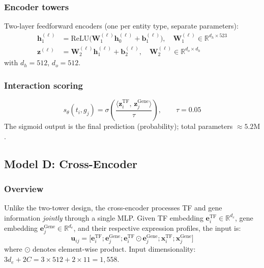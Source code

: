 \documentclass[10pt,twocolumn]{article}
\begin{document}
\subsubsection{Encoder towers}
Two-layer feedforward encoders (one per entity type, separate parameters):
\begin{align}
    \mathbf{h}_1^{(\ell)} &= \text{ReLU}\!\bigl(\mathbf{W}_1^{(\ell)}\mathbf{h}_0^{(\ell)} + \mathbf{b}_1^{(\ell)}\bigr), \quad
    \mathbf{W}_1^{(\ell)} \in \mathbb{R}^{d_h \times 523} \\
    \mathbf{z}^{(\ell)} &= \mathbf{W}_2^{(\ell)}\mathbf{h}_1^{(\ell)} + \mathbf{b}_2^{(\ell)}, \quad
    \mathbf{W}_2^{(\ell)} \in \mathbb{R}^{d_o \times d_h}
\end{align}
with $d_h = 512$, $d_o = 512$.

\subsubsection{Interaction scoring}
\begin{equation}
    s_\theta(t_i, g_j) = \sigma\!\left(\frac{\langle \mathbf{z}^{\text{TF}}_i,\,\mathbf{z}^{\text{Gene}}_j \rangle}{\tau}\right),
    \qquad \tau = 0.05
\end{equation}
The sigmoid output is the final prediction (probability); total parameters $\approx 5.2\mathrm{M}$.

\subsection{Model D: Cross-Encoder}
\label{sec:cross_encoder}

\subsubsection{Overview}
Unlike the two-tower design, the cross-encoder processes TF and gene information
\emph{jointly} through a single MLP.
Given TF embedding $\mathbf{e}^{\text{TF}}_i \in \mathbb{R}^{d_e}$, gene
embedding $\mathbf{e}^{\text{Gene}}_j \in \mathbb{R}^{d_e}$, and their
respective expression profiles, the input is:
\begin{equation}
    \mathbf{u}_{ij} = \bigl[\mathbf{e}^{\text{TF}}_i \mathbin{;} \mathbf{e}^{\text{Gene}}_j \mathbin{;}
    \mathbf{e}^{\text{TF}}_i \odot \mathbf{e}^{\text{Gene}}_j \mathbin{;}
    \mathbf{x}^{\text{TF}}_i \mathbin{;} \mathbf{x}^{\text{Gene}}_j\bigr]
    \label{eq:cross_input}
\end{equation}
where $\odot$ denotes element-wise product.
Input dimensionality: $3 d_e + 2C = 3 \times 512 + 2 \times 11 = 1{,}558$.
\end{document}
